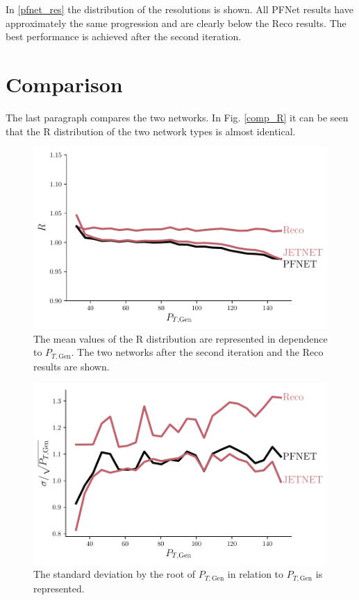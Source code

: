 \documentclass[12pt, a4paper]{thesis}
\begin{document}
In \ref{pfnet_res} the distribution of the resolutions is shown. All
PFNet results have approximately the same progression and are clearly
below the Reco results. The best performance is achieved after the
second iteration.

\section{Comparison}
\label{sec:org638f190}

The last paragraph compares the two networks. In Fig. \ref{comp_R} it can be seen that the R distribution of the two network types is almost identical.

\begin{figure}[htbp]
\centering
\includegraphics[width=.9\linewidth]{../images/comp_R.pdf}
\caption{\label{fig:org944aa66}
The mean values of the R distribution are represented in dependence to \(P_{T, \text{Gen}}\). The two networks after the second iteration and the Reco results are shown.}
\end{figure}

\begin{figure}[htbp]
\centering
\includegraphics[width=.9\linewidth]{../images/comp_res.pdf}
\caption{\label{fig:org3551bdf}
The standard deviation by the root of \(P_{T, \text{Gen}}\) in relation to \(P_{T, \text{Gen}}\) is represented.}
\end{figure}
\end{document}
